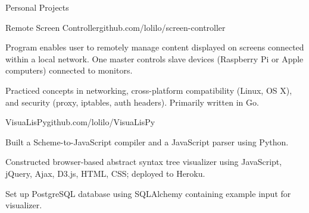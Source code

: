 \documentclass{resume} %
\begin{document}

\begin{rSection}{Personal Projects}


\begin{rSubsection}{Remote Screen Controller}{github.com/lolilo/screen-controller}{}{}
\item Program enables user to remotely manage content displayed on screens connected within a local network. One master controls slave devices (Raspberry Pi or Apple computers) connected to monitors.
\item Practiced concepts in networking, cross-platform compatibility (Linux, OS X), and security (proxy, iptables, auth headers). Primarily written in Go.
\end{rSubsection}


\begin{rSubsection}{VisuaLisPy}{github.com/lolilo/VisuaLisPy}{}{}
\item Built a Scheme-to-JavaScript compiler and a JavaScript parser using Python.
\item Constructed browser-based abstract syntax tree visualizer using JavaScript, jQuery, Ajax, D3.js, HTML, CSS; deployed to Heroku.
\item Set up PostgreSQL database using SQLAlchemy containing example input for visualizer.
\end{rSubsection}

\end{rSection}

\end{document}
